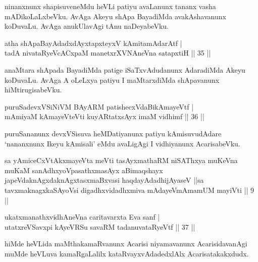 \begin{artha}
ninanxnunx shapisuveneMdu heVLi patiyu avaLanunx tananx vasha 
mADikoLaLxbeVku. AvAga Akeyu shApa BayadiMda avakAshavanunx koDuvaLu. 
AvAga anukUlavAgi tAnu naDeyabeVku.
\end{artha}


\begin{shl}
atha shApaBayAdadxdAyxtapxteyxV kAmitamAdarAtf | \\
tadA nivataRyeVcACxpaM manetxrXVNAneVna satapxtiH \hfill|| 35 || 
\end{shl}

\begin{artha}
anaMtara shApada BayadiMda patige iSaTxvAdudanunx AdaradiMda Akeyu 
koDuvaLu. AvAga A oLeLxya patiyu I maMtarxdiMda shApavanunx 
hiMtirugisabeVku.
\end{artha}


\begin{shl}
puruSadevxVSiNiVM BAyARM patishecxVdaBikAmayeVtf | \\
mAmiyaM kAmayeVteVti kuyARtatxsAyx imaM vidhimf \hfill|| 36 || 
\end{shl}

\begin{artha}
puruSananunx devxVSisuva heMDatiyanunx patiyu kAmisuvudAdare 
`nananxnunx Ikeyu kAmisali' eMdu avaLigAgi I vidhiyanunx AcarisabeVku.
\end{artha}

\begin{shl}
sa yAmiceCxVtAkxmayeVta meVti tasAyxmathaRM niSAThxya muKeVna muKaM sanAdhxyoVpasathxmasAyx aBimaqshayx japeVdaknAgxdaknAgxtasxmaBxvasi haqdayAdadhijAyaseV ||sa tavxmaknagxkaSAyoV\s si digadhxvidadhxmiva mAdayeVmAmamUM mayiVti || 9 ||
\end{shl}


\begin{shl}
ukatxmanathxvidhAneVna  caritavarxta Eva sanf | \\
utatxreVSavxpi kAyeVRSu savaRM tadanuvataRyeVtf \hfill|| 37 || 
\end{shl}

\begin{artha}
hiMde heVLida maMthakamaRvanunx Acarisi niyamavanunx AcarisidavanAgi 
muMde heVLuva kamaRgaLalilx kataRvayxvAdadedxlAlx Acarisatakakxdudx.
\end{artha}

